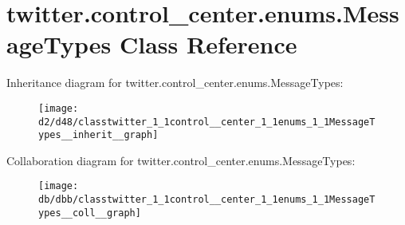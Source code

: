 \hypertarget{classtwitter_1_1control__center_1_1enums_1_1MessageTypes}{}\section{twitter.\+control\+\_\+center.\+enums.\+Message\+Types Class Reference}
\label{classtwitter_1_1control__center_1_1enums_1_1MessageTypes}


Inheritance diagram for twitter.\+control\+\_\+center.\+enums.\+Message\+Types\+:\nopagebreak
\begin{figure}[H]
\begin{center}
\leavevmode
\texttt{[image: d2/d48/classtwitter\_1\_1control\_\_center\_1\_1enums\_1\_1MessageTypes\_\_inherit\_\_graph]}
\end{center}
\end{figure}


Collaboration diagram for twitter.\+control\+\_\+center.\+enums.\+Message\+Types\+:\nopagebreak
\begin{figure}[H]
\begin{center}
\leavevmode
\texttt{[image: db/dbb/classtwitter\_1\_1control\_\_center\_1\_1enums\_1\_1MessageTypes\_\_coll\_\_graph]}
\end{center}
\end{figure}
